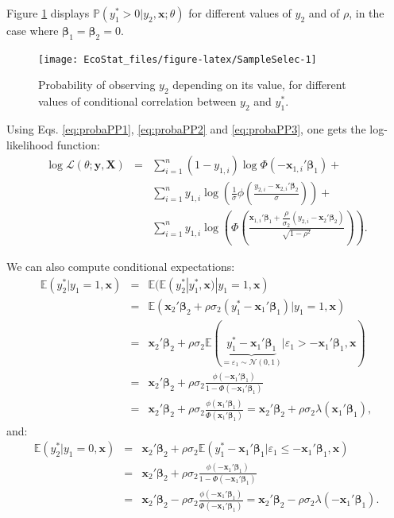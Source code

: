 \documentclass[
  12pt,
]{book}
\theoremstyle{definition}
\theoremstyle{definition}
\theoremstyle{definition}
\theoremstyle{definition}
\theoremstyle{remark}
\begin{document}
Figure \ref{fig:SampleSelec} displays \(\mathbb{P}(y_1^*>0|y_2,\mathbf{x};\theta)\) for different values of \(y_2\) and of \(\rho\), in the case where \(\boldsymbol\beta_1=\boldsymbol\beta_2=0\).

\begin{figure}
\texttt{[image: EcoStat\_files/figure-latex/SampleSelec-1]} \caption{Probability of observing $y_2$ depending on its value, for different values of conditional correlation between $y_2$ and $y_1^*$.}\label{fig:SampleSelec}
\end{figure}

Using Eqs. \eqref{eq:probaPP1}, \eqref{eq:probaPP2} and \eqref{eq:probaPP3}, one gets the log-likelihood function:
\begin{eqnarray*}
\log \mathcal{L}(\theta;\mathbf{y},\mathbf{X}) &=& \sum_{i=1}^n  (1 - y_{1,i})\log \Phi(-\mathbf{x}_{1,i}'\boldsymbol\beta_1) + \\
&&  \sum_{i=1}^n y_{1,i} \log \left(  \frac{1}{\sigma}\phi\left(\frac{y_{2,i} - \mathbf{x}_{2,i}'\boldsymbol\beta_2}{\sigma}\right)\right) + \\
&&  \sum_{i=1}^n y_{1,i} \log \left(\Phi\left( \frac{\mathbf{x}_{1,i}'\boldsymbol\beta_1 + \dfrac{\rho}{\sigma_2}(y_{2,i}-\mathbf{x}_2'\boldsymbol\beta_2)}{\sqrt{1-\rho^2}}\right)\right).
\end{eqnarray*}

We can also compute conditional expectations:
\begin{eqnarray}
\mathbb{E}(y_2^*|y_1=1,\mathbf{x}) &=& \mathbb{E}(\mathbb{E}(y_2^*|y_1^*,\mathbf{x})|y_1=1,\mathbf{x})\nonumber\\
&=& \mathbb{E}(\mathbf{x}_2'\boldsymbol\beta_2 + \rho\sigma_2(y_1^*-\mathbf{x}_1'\boldsymbol\beta_1)|y_1=1,\mathbf{x})\nonumber\\
&=& \mathbf{x}_2'\boldsymbol\beta_2 + \rho\sigma_2\mathbb{E}( \underbrace{y_1^*-\mathbf{x}_1'\boldsymbol\beta_1}_{=\varepsilon_1 \sim\mathcal{N}(0,1)}|\varepsilon_1>-\mathbf{x}_1'\boldsymbol\beta_1,\mathbf{x})\nonumber\\
&=& \mathbf{x}_2'\boldsymbol\beta_2 + \rho\sigma_2\frac{\phi(-\mathbf{x}_1'\boldsymbol\beta_1)}{1 - \Phi(-\mathbf{x}_1'\boldsymbol\beta_1)}\nonumber\\
&=& \mathbf{x}_2'\boldsymbol\beta_2 + \rho\sigma_2\frac{\phi(\mathbf{x}_1'\boldsymbol\beta_1)}{\Phi(\mathbf{x}_1'\boldsymbol\beta_1)}=\mathbf{x}_2'\boldsymbol\beta_2 + \rho\sigma_2\lambda(\mathbf{x}_1'\boldsymbol\beta_1),\label{eq:y2y11}
\end{eqnarray}
and:
\begin{eqnarray*}
\mathbb{E}(y_2^*|y_1=0,\mathbf{x}) &=&  \mathbf{x}_2'\boldsymbol\beta_2 + \rho\sigma_2\mathbb{E}(y_1^*-\mathbf{x}_1'\boldsymbol\beta_1|\varepsilon_1\le-\mathbf{x}_1'\boldsymbol\beta_1,\mathbf{x})\\
&=& \mathbf{x}_2'\boldsymbol\beta_2 + \rho\sigma_2\frac{\phi(-\mathbf{x}_1'\boldsymbol\beta_1)}{1 - \Phi(-\mathbf{x}_1'\boldsymbol\beta_1)}\\
&=& \mathbf{x}_2'\boldsymbol\beta_2 - \rho\sigma_2\frac{\phi(-\mathbf{x}_1'\boldsymbol\beta_1)}{\Phi(-\mathbf{x}_1'\boldsymbol\beta_1)}=\mathbf{x}_2'\boldsymbol\beta_2 - \rho\sigma_2\lambda(-\mathbf{x}_1'\boldsymbol\beta_1).
\end{eqnarray*}
\end{document}
